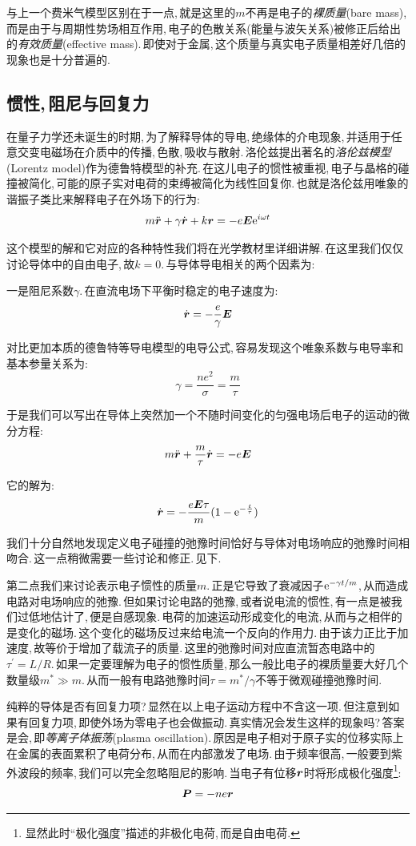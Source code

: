 与上一个费米气模型区别在于一点,\,就是这里的$m$不再是电子的\emph{裸质量}(bare mass),\,而是由于与周期性势场相互作用,\,电子的色散关系(能量与波矢关系)被修正后给出的\emph{有效质量}(effective mass).\,即使对于金属,\,这个质量与真实电子质量相差好几倍的现象也是十分普遍的.



\subsection{惯性,\,阻尼与回复力}

在量子力学还未诞生的时期,\,为了解释导体的导电,\,绝缘体的介电现象,\,并适用于任意交变电磁场在介质中的传播,\,色散,\,吸收与散射.\,洛伦兹提出著名的\emph{洛伦兹模型}(Lorentz model)作为德鲁特模型的补充.\,在这儿电子的惯性被重视,\,电子与晶格的碰撞被简化,\,可能的原子实对电荷的束缚被简化为线性回复你.\,也就是洛伦兹用唯象的谐振子类比来解释电子在外场下的行为:
\[m\ddot{\boldsymbol{r}}+\gamma \dot{\boldsymbol{r}}+ k\boldsymbol{r}=-e\boldsymbol{E}{\rm e}^{i\omega t}\]

这个模型的解和它对应的各种特性我们将在光学教材里详细讲解.\,在这里我们仅仅讨论导体中的自由电子,\,故$k=0$.\,与导体导电相关的两个因素为:

一是阻尼系数$\gamma$.\,在直流电场下平衡时稳定的电子速度为:
\[\dot{\boldsymbol{r}}=-\frac{e}{\gamma}\boldsymbol{E}\]

对比更加本质的德鲁特等导电模型的电导公式,\,容易发现这个唯象系数与电导率和基本参量关系为:
\[\gamma=\frac{ne^2}{\sigma}=\frac{m}{\tau}\]

于是我们可以写出在导体上突然加一个不随时间变化的匀强电场后电子的运动的微分方程:
\[m\ddot{\boldsymbol{r}}+\frac{m}{\tau} \dot{\boldsymbol{r}}=-e\boldsymbol{E}\]

它的解为:
\[\dot{\boldsymbol{r}}=-\frac{e\boldsymbol{E}\tau}{m}(1-{\rm e}^{-\frac{t}{\tau}})\]

我们十分自然地发现定义电子碰撞的弛豫时间恰好与导体对电场响应的弛豫时间相吻合.\,这一点稍微需要一些讨论和修正.\,见下.

第二点我们来讨论表示电子惯性的质量$m$.\,正是它导致了衰减因子${\rm e}^{-\gamma t/m}$,\,从而造成电路对电场响应的弛豫.\,但如果讨论电路的弛豫,\,或者说电流的惯性,\,有一点是被我们过低地估计了,\,便是自感现象.\,电荷的加速运动形成变化的电流,\,从而与之相伴的是变化的磁场.\,这个变化的磁场反过来给电流一个反向的作用力.\,由于该力正比于加速度,\,故等价于增加了载流子的质量.\,这里的弛豫时间对应直流暂态电路中的$\tau^\prime=L/R$.\,如果一定要理解为电子的惯性质量,\,那么一般比电子的裸质量要大好几个数量级$m^\ast\gg m$.\,从而一般有电路弛豫时间$\tau=m^\ast/\gamma$不等于微观碰撞弛豫时间.

纯粹的导体是否有回复力项?\,显然在以上电子运动方程中不含这一项.\,但注意到如果有回复力项,\,即使外场为零电子也会做振动.\,真实情况会发生这样的现象吗?\,答案是会,\,即\emph{等离子体振荡}(plasma oscillation).\,原因是电子相对于原子实的位移实际上在金属的表面累积了电荷分布,\,从而在内部激发了电场.\,由于频率很高,\,一般要到紫外波段的频率,\,我们可以完全忽略阻尼的影响.\,当电子有位移$\boldsymbol{r}$时将形成极化强度\footnote{显然此时``极化强度''描述的非极化电荷,\,而是自由电荷.}:
\[\boldsymbol{P}=-ne\boldsymbol{r}\]

